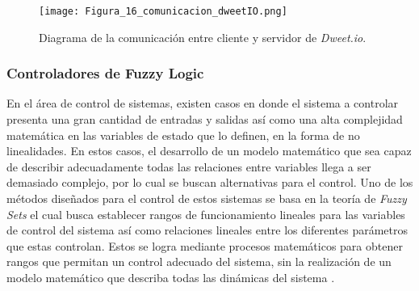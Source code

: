 \begin{figure}[H]
	\centering
	\texttt{[image: Figura\_16\_comunicacion\_dweetIO.png]}
	\caption{Diagrama de la comunicación entre cliente y servidor de \textit{Dweet.io}.}
	\label{fig:mesh16}
\end{figure}

\subsubsection*{Controladores de Fuzzy Logic}
En el área de control de sistemas, existen casos en donde el sistema a controlar presenta una gran cantidad de entradas y salidas así como una alta complejidad matemática en las variables de estado que lo definen, en la forma de no linealidades. En estos casos, el desarrollo de un modelo matemático que sea capaz de describir adecuadamente todas las relaciones entre variables llega a ser demasiado complejo, por lo cual se buscan alternativas para el control. Uno de los métodos diseñados para el control de estos sistemas se basa en la teoría de \textit{Fuzzy Sets} el cual busca establecer rangos de funcionamiento lineales para las variables de control del sistema así como relaciones lineales entre los diferentes parámetros que estas controlan. Estos se logra mediante procesos matemáticos para obtener rangos que permitan un control adecuado del sistema, sin la realización de un modelo matemático que describa todas las dinámicas del sistema \cite{verbruggen_fuzzy_1999}.



